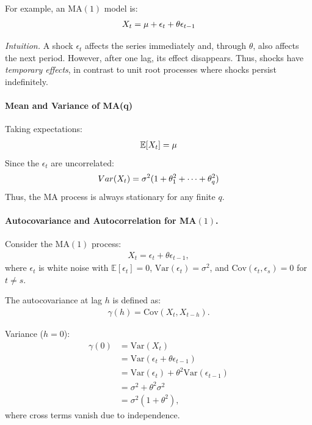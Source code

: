\documentclass[10pt,a4paper]{article}
\begin{document}
	For example, an MA$(1)$ model is:
	\begin{align*}
	\large X_t = \mu + \epsilon_t + \theta \epsilon_{t-1}
	\end{align*}
	
	\textit{Intuition.} A shock $\epsilon_t$ affects the series immediately and, through $\theta$, also affects the next period. However, after one lag, its effect disappears. Thus, shocks have \textit{temporary effects}, in contrast to unit root processes where shocks persist indefinitely.
	
	\paragraph{Mean and Variance of MA(q)} 
	Taking expectations:
	\begin{align*}
	\large \mathbb{E}[X_t] = \mu
	\end{align*}
	Since the $\epsilon_t$ are uncorrelated:
	\begin{align*}
	\large Var(X_t) = \sigma^2 (1 + \theta_1^2 + \cdots + \theta_q^2)
	\end{align*}
	Thus, the MA process is always stationary for any finite $q$.
	
	\paragraph{Autocovariance and Autocorrelation for MA$(1)$.}
	
	Consider the MA$(1)$ process:
	\begin{align*}
	X_t = \epsilon_t + \theta \epsilon_{t-1},
	\end{align*}
	where ${\epsilon_t}$ is white noise with $\mathbb{E}[\epsilon_t]=0$, $\text{Var}(\epsilon_t)=\sigma^2$, and $\text{Cov}(\epsilon_t,\epsilon_s)=0$ for $t \ne s$.
	
	The autocovariance at lag $h$ is defined as:
	\begin{align*}
	\gamma(h) = \text{Cov}(X_t, X_{t-h}).
	\end{align*}
	
	Variance ($h=0$):
	\begin{align*}
	\gamma(0) &= \text{Var}(X_t) \\
	&= \text{Var}(\epsilon_t + \theta \epsilon_{t-1}) \\
	&= \text{Var}(\epsilon_t) + \theta^2 \text{Var}(\epsilon_{t-1}) \\
	&= \sigma^2 + \theta^2 \sigma^2 \\
	&= \sigma^2(1+\theta^2),
	\end{align*}
	where cross terms vanish due to independence.
	
\end{document}
